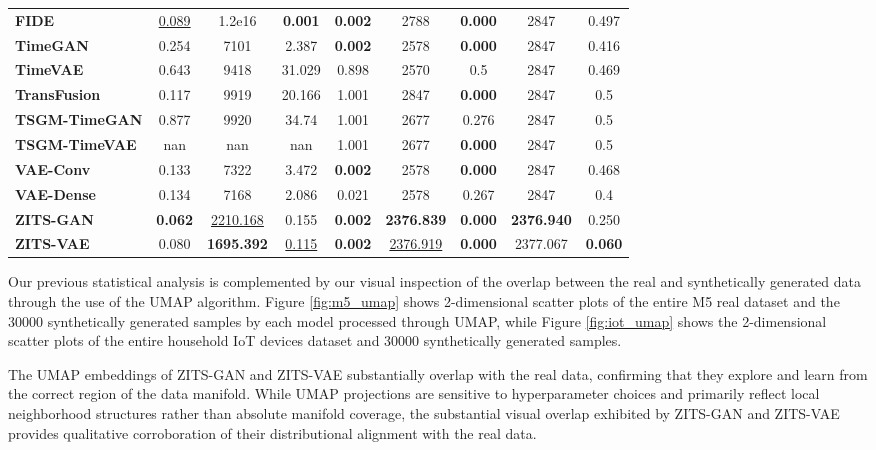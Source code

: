 \documentclass[make,article,submit,moreauthors]{Definitions/mdpi}
\begin{document}
\begin{table}[htbp]
\begin{tabular}{l cccccccc}
\textbf{FIDE}         & \underline{0.089} & 1.2e16 & \textbf{0.001} & \textbf{0.002} & 2788 & \textbf{0.000} & 2847 & 0.497 \\
\textbf{TimeGAN}      & 0.254 & 7101 & 2.387 & \textbf{0.002} & 2578 & \textbf{0.000} & 2847 & 0.416 \\
\textbf{TimeVAE}      & 0.643 & 9418 & 31.029 & 0.898 & 2570 & 0.5 & 2847 & 0.469 \\
\textbf{TransFusion}  & 0.117 & 9919 & 20.166 & 1.001 & 2847 & \textbf{0.000} & 2847 & 0.5 \\
\textbf{TSGM-TimeGAN} & 0.877 & 9920 & 34.74 & 1.001 & 2677 & 0.276 & 2847 & 0.5 \\
\textbf{TSGM-TimeVAE} & nan & nan & nan & 1.001 & 2677 & \textbf{0.000} & 2847 & 0.5 \\
\textbf{VAE-Conv}     & 0.133 & 7322 & 3.472 & \textbf{0.002} & 2578 & \textbf{0.000} & 2847 & 0.468 \\
\textbf{VAE-Dense}    & 0.134 & 7168 & 2.086 & 0.021 & 2578 & 0.267 & 2847 & 0.4 \\
\textbf{ZITS-GAN}     & \textbf{0.062} & \underline{2210.168} & 0.155 & \textbf{0.002} & \textbf{2376.839} & \textbf{0.000} & \textbf{2376.940} & 0.250 \\
\textbf{ZITS-VAE}     & 0.080 & \textbf{1695.392} & \underline{0.115} & \textbf{0.002} & \underline{2376.919} & \textbf{0.000} & 2377.067 & \textbf{0.060} \\
\bottomrule
\end{tabular}
\end{table}
Our previous statistical analysis is complemented by our visual inspection of the overlap between the real and synthetically generated data through the use of the UMAP \cite{ref37} algorithm. Figure \ref{fig:m5_umap} shows 2-dimensional scatter plots of the entire M5 real dataset and the 30000 synthetically generated samples by each model processed through UMAP, while Figure \ref{fig:iot_umap} shows the 2-dimensional scatter plots of the entire household IoT devices dataset and 30000 synthetically generated samples. 

The UMAP embeddings of ZITS-GAN and ZITS-VAE substantially overlap with the real data, confirming that they explore and learn from the correct region of the data manifold. While UMAP projections are sensitive to hyperparameter choices and primarily reflect local neighborhood structures rather than absolute manifold coverage, the substantial visual overlap exhibited by ZITS-GAN and ZITS-VAE provides qualitative corroboration of their distributional alignment with the real data.
\end{document}
